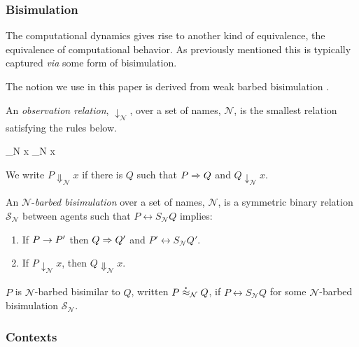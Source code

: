 \subsubsection{Bisimulation}

The computational dynamics gives rise to another kind of equivalence,
the equivalence of computational behavior. As previously mentioned
this is typically captured \emph{via} some form of bisimulation.


The notion we use in this paper is derived from weak barbed
bisimulation \cite{milner91polyadicpi}. 

\begin{definition}
An \emph{observation relation}, $\downarrow_{\mathcal N}$, over a set
of names, $\mathcal N$, is the smallest relation satisfying the rules
below.

		  { \downarrow_{\mathcal N} x}
		  { \downarrow_{\mathcal N} x}

We write $P \Downarrow_{\mathcal N} x$ if there is $Q$ such that 
$P \Rightarrow Q$ and $Q \downarrow_{\mathcal N} x$.
\end{definition}

\begin{definition}
An  ${\mathcal N}$-\emph{barbed bisimulation} over a set of names, ${\mathcal N}$, is a symmetric binary relation 
${\mathcal S}_{\mathcal N}$ between agents such that $P\rel{S}_{\mathcal N}Q$ implies:
\begin{enumerate}
\item If $P \rightarrow P'$ then $Q \Rightarrow Q'$ and $P'\rel{S}_{\mathcal N} Q'$.
\item If $P\downarrow_{\mathcal N} x$, then $Q\Downarrow_{\mathcal N} x$.
\end{enumerate}
$P$ is ${\mathcal N}$-barbed bisimilar to $Q$, written
$P \stackrel{\centerdot}{\approx}_{\mathcal N} Q$, if $P \rel{S}_{\mathcal N} Q$ for some ${\mathcal N}$-barbed bisimulation ${\mathcal S}_{\mathcal N}$.
\end{definition}

\subsubsection{Contexts}

